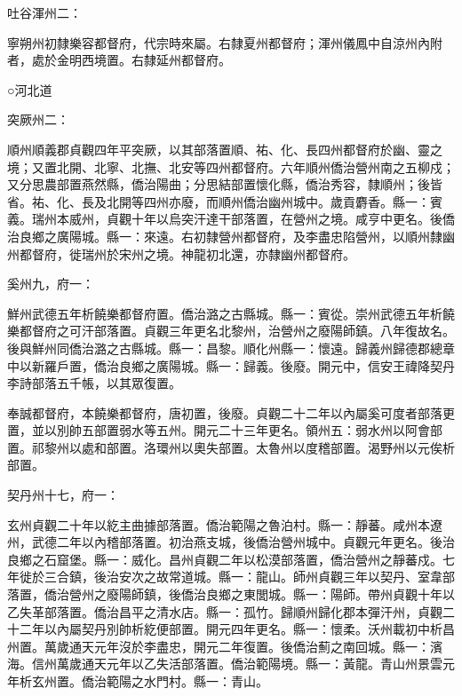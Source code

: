 \begin{pinyinscope}
 吐谷渾州二：



 寧朔州初隸樂容都督府，代宗時來屬。右隸夏州都督府；渾州儀鳳中自涼州內附者，處於金明西境置。右隸延州都督府。



 ○河北道



 突厥州二：



 順州順義郡貞觀四年平突厥，以其部落置順、祐、化、長四州都督府於幽、靈之境；又置北開、北寧、北撫、北安等四州都督府。六年順州僑治營州南之五柳戍；又分思農部置燕然縣，僑治陽曲；分思結部置懷化縣，僑治秀容，隸順州；後皆省。祐、化、長及北開等四州亦廢，而順州僑治幽州城中。歲貢麝香。縣一：賓義。瑞州本威州，貞觀十年以烏突汗達干部落置，在營州之境。咸亨中更名。後僑治良鄉之廣陽城。縣一：來遠。右初隸營州都督府，及李盡忠陷營州，以順州隸幽州都督府，徙瑞州於宋州之境。神龍初北還，亦隸幽州都督府。



 奚州九，府一：



 鮮州武德五年析饒樂都督府置。僑治潞之古縣城。縣一：賓從。崇州武德五年析饒樂都督府之可汗部落置。貞觀三年更名北黎州，治營州之廢陽師鎮。八年復故名。後與鮮州同僑治潞之古縣城。縣一：昌黎。順化州縣一：懷遠。歸義州歸德郡總章中以新羅戶置，僑治良鄉之廣陽城。縣一：歸義。後廢。開元中，信安王禕降契丹李詩部落五千帳，以其眾復置。



 奉誠都督府，本饒樂都督府，唐初置，後廢。貞觀二十二年以內屬奚可度者部落更置，並以別帥五部置弱水等五州。開元二十三年更名。領州五：弱水州以阿會部置。祁黎州以處和部置。洛環州以奧失部置。太魯州以度稽部置。渴野州以元俟析部置。



 契丹州十七，府一：



 玄州貞觀二十年以紇主曲據部落置。僑治範陽之魯泊村。縣一：靜蕃。咸州本遼州，武德二年以內稽部落置。初治燕支城，後僑治營州城中。貞觀元年更名。後治良鄉之石窟堡。縣一：威化。昌州貞觀二年以松漠部落置，僑治營州之靜蕃戍。七年徙於三合鎮，後治安次之故常道城。縣一：龍山。師州貞觀三年以契丹、室韋部落置，僑治營州之廢陽師鎮，後僑治良鄉之東閭城。縣一：陽師。帶州貞觀十年以乙失革部落置。僑治昌平之清水店。縣一：孤竹。歸順州歸化郡本彈汗州，貞觀二十二年以內屬契丹別帥析紇便部置。開元四年更名。縣一：懷柔。沃州載初中析昌州置。萬歲通天元年沒於李盡忠，開元二年復置。後僑治薊之南回城。縣一：濱海。信州萬歲通天元年以乙失活部落置。僑治範陽境。縣一：黃龍。青山州景雲元年析玄州置。僑治範陽之水門村。縣一：青山。




\end{pinyinscope}
